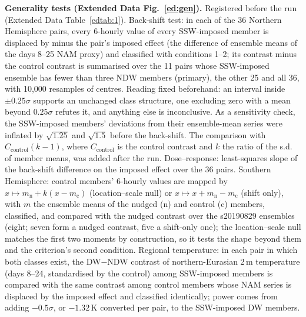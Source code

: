 \documentclass[11pt]{article}
\begin{document}
\textbf{Generality tests (Extended Data Fig.~\ref{ed:gen}).} Registered before the run (Extended Data Table~\ref{edtab:1}). Back-shift test: in each of the 36 Northern Hemisphere pairs, every 6-hourly value of every SSW-imposed member is displaced by minus the pair's imposed effect (the difference of ensemble means of the days 8--25 NAM proxy) and classified with conditions 1--2; its contrast minus the control contrast is summarised over the 11 pairs whose SSW-imposed ensemble has fewer than three NDW members (primary), the other 25 and all 36, with 10,000 resamples of centres. Reading fixed beforehand: an interval inside $\pm0.25\sigma$ supports an unchanged class structure, one excluding zero with a mean beyond $0.25\sigma$ refutes it, and anything else is inconclusive. As a sensitivity check, the SSW-imposed members' deviations from their ensemble-mean series were inflated by $\sqrt{1.25}$ and $\sqrt{1.5}$ before the back-shift. The comparison with $C_\mathrm{control}(k-1)$, where $C_\mathrm{control}$ is the control contrast and $k$ the ratio of the s.d. of member means, was added after the run. Dose--response: least-squares slope of the back-shift difference on the imposed effect over the 36 pairs. Southern Hemisphere: control members' 6-hourly values are mapped by $x \mapsto m_\mathrm{n} + k(x - m_\mathrm{c})$ (location--scale null) or $x \mapsto x + m_\mathrm{n} - m_\mathrm{c}$ (shift only), with $m$ the ensemble means of the nudged (n) and control (c) members, classified, and compared with the nudged contrast over the s20190829 ensembles (eight; seven form a nudged contrast, five a shift-only one); the location--scale null matches the first two moments by construction, so it tests the shape beyond them and the criterion's second condition. Regional temperature: in each pair in which both classes exist, the DW$-$NDW contrast of northern-Eurasian 2\,m temperature (days 8--24, standardised by the control) among SSW-imposed members is compared with the same contrast among control members whose NAM series is displaced by the imposed effect and classified identically; power comes from adding $-0.5\sigma$, or $-1.32$\,K converted per pair, to the SSW-imposed DW members.
\end{document}
